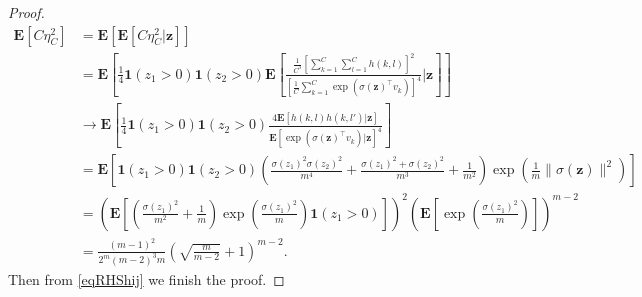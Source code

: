 \documentclass[10pt,a4paper]{amsart}
\newcommand\mf{\mathbf}
\newcommand{\E}{\mathbf{E}}
\newcommand{\bea}{\begin{equation}\begin{aligned}}
\newcommand{\eea}{\end{aligned}\end{equation}}
\newcommand{\rw}{\rightarrow}
\renewcommand{\l}{\left}
\renewcommand{\r}{\right}
\begin{document}
\begin{proof}
\bea
\E[C\eta_C^2]&=\E[\E[C\eta_C^2|\mf{z}]]\\
&=\E\l[\frac{1}{4}\mf{1}(z_1>0)\mf{1}(z_2>0)\E\l[\frac{\frac{1}{C^3}\l[\sum_{k=1}^C\sum_{l=1}^C h(k,l)\r]^2}{\l[\frac{1}{C}\sum_{k=1}^C \exp(\sigma(\mf{z})^\top v_k)\r]^4}\bigg|\mf{z}\r]\r]\\
&\rw \E\l[\frac{1}{4}\mf{1}(z_1>0)\mf{1}(z_2>0)\frac{4\E\l[ h(k,l)h(k,l')\bigg|\mf{z}\r]}{\E\l[ \exp(\sigma(\mf{z})^\top v_k)\bigg|\mf{z}\r]^4}\r]\\
&=\E\l[\mf{1}(z_1>0)\mf{1}(z_2>0)\l(\frac{\sigma(z_1)^2\sigma(z_2)^2}{m^4}+\frac{\sigma(z_1)^2+\sigma(z_2)^2}{m^3}+\frac{1}{m^2}\r)\exp\l(\frac{1}{m}\|\sigma(\mf{z})\|^2\r)\r]\\
&=\l(\E\l[\l(\frac{\sigma(z_1)^2}{m^2}+\frac{1}{m}\r)\exp\l(\frac{\sigma(z_1)^2}{m}\r)\mf{1}(z_1>0)\r]\r)^2 \l(\E\l[\exp\l(\frac{\sigma(z_1)^2}{m}\r)\r]\r)^{m-2}\\
&=\frac{(m-1)^2}{2^m(m-2)^3m}\l(\sqrt{\frac{m}{m-2}}+1\r)^{m-2}.
\eea
Then from \eqref{eqRHShij} we finish the proof.
\end{proof}
\end{document}
